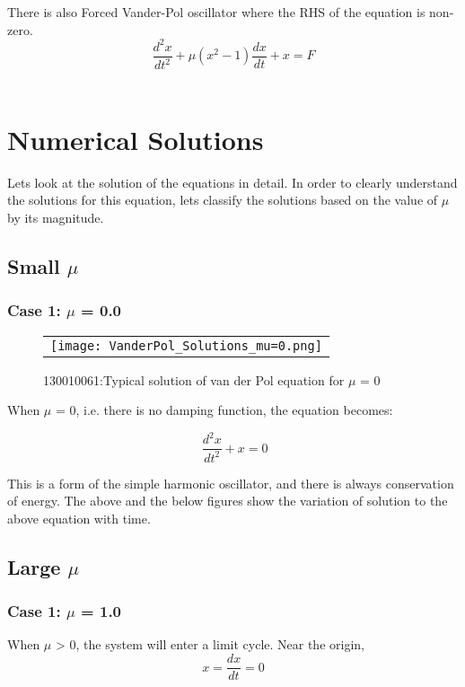 \documentclass[12pt, a4paper]{report}
\begin{document}
There is also Forced Vander-Pol oscillator where the RHS of the equation is non-zero.
\begin{equation}
\frac{d^2 x}{dt^2}+\mu(x^2-1)\frac{dx}{dt}+x=F
\end{equation}\\


\chapter{Numerical Solutions}
Lets look at the solution of the equations in detail. In order to clearly understand the solutions for this equation, lets classify the solutions based on the value of $\mu$ by its magnitude.

\section{Small $\mu$}
\subsection{Case 1: $\mu$ = 0.0}


\begin{figure}[H]
	\centering
	\begin{tabular} {l}
	\texttt{[image: VanderPol\_Solutions\_mu=0.png]} 
	\end{tabular}
	\caption{130010061:Typical solution of van der Pol equation for $\mu$ = 0}
\end{figure}
\label{fig2} 

When $\mu$ = 0, i.e. there is no damping function, the equation becomes: 

\begin{equation}\
\frac{d^2 x}{dt^2}+x=0
\end{equation}

This is a form of the simple harmonic oscillator, and there is always conservation of energy.
The above and the below figures show the variation of solution to the above equation with time.



\section{Large $\mu$}
\subsection{Case 1: $\mu$ = 1.0}
When $\mu$ > 0, the system will enter a limit cycle. Near the origin, 
\begin{equation}
x = \frac{dx}{dt} = 0
\end{equation}\\
\end{document}
